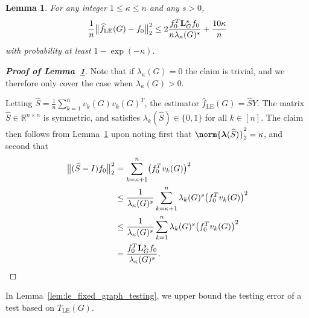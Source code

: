 \documentclass{article}
\newcommand{\Reals}{\mathbb{R}}
\newcommand{\1}{\mathbf{1}}
\newcommand{\lambdavec}{\boldsymbol{\lambda}}
\newcommand{\Lap}{{\bf L}}
\newcommand{\wh}[1]{\widehat{#1}}
\newcommand{\LE}{\mathrm{LE}}
\theoremstyle{alden}
\theoremstyle{aldenthm}
\newtheorem{lemma}{Lemma}
\theoremstyle{definition}
\theoremstyle{remark}
\begin{document}
\begin{lemma}
	\label{lem:le_fixed_graph_estimation}
	For any integer $1 \leq \kappa \leq n$ and any $s > 0$,
	\begin{equation}
	\label{eqn:le_fixed_graph_estimation}
	\frac{1}{n}\bigl\|\wh{f}_{\LE}(G) - f_0\bigr\|_2^2 \leq 2\frac{f_0^T \Lap_{G}^s f_0}{n\lambda_{\kappa}(G)^s} + \frac{10\kappa}{n}
	\end{equation}
	with probability at least $1 - \exp(-\kappa)$.
\end{lemma}
\begin{proof}[\textbf{Proof of Lemma~\ref{lem:le_fixed_graph_estimation}}]
	Note that if $\lambda_{\kappa}(G) = 0$ the claim is trivial, and we therefore only cover the case when $\lambda_{\kappa}(G) > 0$. 
	
	Letting $\wh{S} = \frac{1}{n}\sum_{k = 1}^{n} v_k(G) v_k(G)^T$, the estimator $\wh{f}_{\LE}(G) = \wh{S}Y$. The matrix $\wh{S} \in \Reals^{n \times n}$ is symmetric, and satisfies $\lambda_k(\wh{S}) \in \{0,1\}$ for all $k \in [n]$. The claim then follows from Lemma~\ref{lem:le_fixed_graph_estimation} upon noting first that $\norm{\lambdavec(\wh{S})}_2^2 = \kappa$, and second that
	\begin{equation}
	\label{pf:le_fixed_graph_estimation_1}
	\begin{aligned}
	\bigl\|(\wh{S} - I)f_0\bigr\|_2^2 & = \sum_{k = \kappa + 1}^{n} \bigl(f_0^T v_k(G)\bigr)^2 \\
	& \leq \frac{1}{\lambda_{\kappa}(G)^s}\sum_{k = \kappa + 1}^{n} \lambda_{k}(G)^s \bigl(f_0^T v_k(G)\bigr)^2 \\
	& \leq \frac{1}{\lambda_{\kappa}(G)^s}\sum_{k = 1}^{n} \lambda_{k}(G)^s \bigl(f_0^T v_k(G)\bigr)^2 \\
	& = \frac{f_0^T \Lap_G^s f_0}{\lambda_{\kappa}(G)^s}.
	\end{aligned}
	\end{equation} 
\end{proof}

In Lemma~\ref{lem:le_fixed_graph_testing}, we upper bound the testing error of a test based on $T_{\LE}(G)$.
\end{document}
